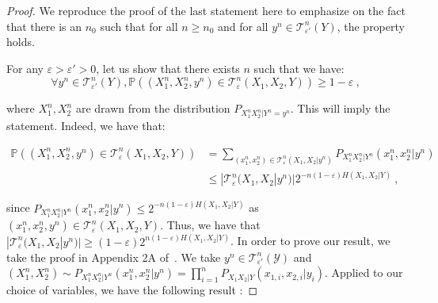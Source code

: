\documentclass[11pt]{article}
\theoremstyle{definition}
\theoremstyle{remark}
\begin{document}
      \begin{proof}
        We reproduce the proof of the last statement here to emphasize on the fact that there is an $n_0$ such that for all $n \geq n_0$ and for all $y^n \in \mathcal{T}^n_{\varepsilon'}(Y)$, the property holds.

        For any $\varepsilon > \varepsilon' > 0$, let us show that there exists $n$ such that we have:
        \[ \forall y^n \in \mathcal{T}^n_{\varepsilon'}(Y), \mathbb{P}\left((X_1^n,X_2^n,y^n) \in \mathcal{T}^n_{\varepsilon}(X_1,X_2,Y) \right) \geq 1-\varepsilon \ , \]
        
        where $X_1^n, X_2^n$ are drawn from the distribution $P_{X_1^nX_2^n|Y^n=y^n}$. This will imply the statement. Indeed, we have that:

        \begin{equation}
          \begin{aligned}
            \mathbb{P}\left((X_1^n,X_2^n,y^n) \in \mathcal{T}^n_{\varepsilon}(X_1,X_2,Y) \right) &= \sum_{(x_1^n,x_2^n) \in \mathcal{T}^n_{\varepsilon}(X_1,X_2|y^n)} P_{X_1^nX_2^n|Y^n}(x_1^n,x_2^n|y^n) \\
            &\leq |\mathcal{T}^n_{\varepsilon}(X_1,X_2|y^n)|2^{-n(1-\varepsilon)H(X_1,X_2|Y)} \ ,
          \end{aligned}
        \end{equation}
      
        since $P_{X_1^nX_2^n|Y^n}(x_1^n,x_2^n|y^n) \leq 2^{-n(1-\varepsilon)H(X_1,X_2|Y)}$ as $(x_1^n,x_2^n,y^n) \in \mathcal{T}^n_{\varepsilon}(X_1,X_2,Y)$. Thus, we have that $|\mathcal{T}^n_{\varepsilon}(X_1,X_2|y^n)| \geq (1-\varepsilon)2^{n(1-\varepsilon)H(X_1,X_2|Y)}$. In order to prove our result, we take the proof in Appendix 2A of~\cite{GK11}. We take $y^n \in \mathcal{T}^n_{\varepsilon'}(\mathcal{Y})$ and $(X_1^n,X_2^n) \sim P_{X_1^nX_2^n|Y^n}(x_1^n,x_2^n|y^n) = \prod_{i=1}^nP_{X_1X_2|Y}(x_{1,i},x_{2,i}|y_i)$. Applied to our choice of variables, we have the following result :


\end{proof}
\end{document}
